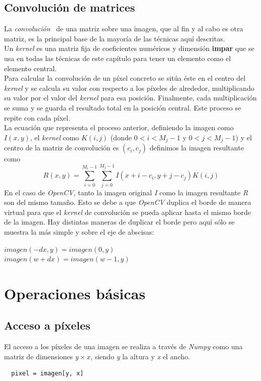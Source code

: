 \subsection{Convolución de matrices}
La \emph{convolución}~\citep*[3.2 Linear
filtering]{szeliski2010computer} de una matriz sobre una imagen, que
al fin y al cabo es otra matriz, es la principal base de la mayoría de
las técnicas aquí descritas. \\
Un \emph{kernel} es una matriz fija de coeficientes numéricos y
dimensión \textbf{impar} que se usa en todas las técnicas de este
capítulo para tener un elemento como el elemento central. \\
Para calcular la convolución de un píxel concreto se sitúa éste en el
centro del \emph{kernel} y se calcula su valor con respecto a los
píxeles de alrededor, multiplicando su valor por el valor del
\emph{kernel} para esa posición. Finalmente, cada multiplicación se
suma y se guarda el resultado total en la posición central. Este
proceso se repite con cada píxel. \\
La ecuación que representa el proceso anterior, definiendo la imagen
como $I(x, y)$, el \emph{kernel} como $K(i, j)$ (donde
$0 < i < M_j - 1$ y $0 < j < M_j - 1$) y el centro de la matriz de
convolución es $(c_i, c_j)$ definimos la imagen resultante como
\begin{equation*}
  R(x, y) = \sum_{i=0}^{M_i-1} \sum_{j=0}^{M_j-1}  I(x + i - c_i, y + j - c_j)K(i,j)
\end{equation*}
En el caso de \emph{OpenCV}, tanto la imagen original \emph{I} como la
imagen resultante \emph{R} son del mismo tamaño. Esto se debe a que
\emph{OpenCV} duplica el borde de manera virtual para que el
\emph{kernel} de convolución se pueda aplicar hasta el mismo borde de
la imagen. Hay distintas maneras de duplicar el borde pero aquí sólo
se muestra la más simple y sobre el eje de abscisas:
\begin{center}
  $imagen(-dx, y) = imagen(0, y)$
  \\
  $imagen(w + dx) = imagen(w - 1, y)$
\end{center}


\section{Operaciones básicas}
\subsection{Acceso a píxeles}
El acceso a los píxeles de una imagen se realiza a través de
\emph{Numpy} como una matriz de dimensiones $y \times x$, siendo
\emph{y} la altura y \emph{x} el ancho.
\begin{verbatim}
  pixel = imagen[y, x]
\end{verbatim}

